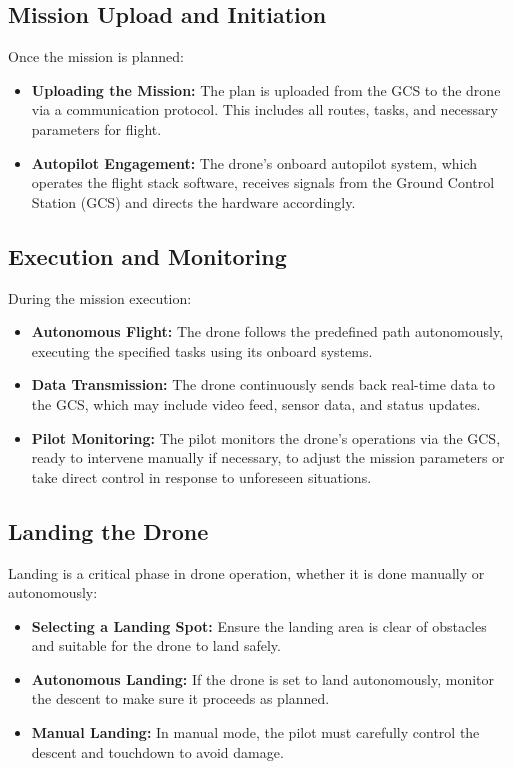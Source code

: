 \subsection{Mission Upload and Initiation}
Once the mission is planned:
\begin{itemize}
    \item \textbf{Uploading the Mission:} The plan is uploaded from the GCS to the drone via a communication protocol. This includes all routes, tasks, and necessary parameters for flight.
    \item \textbf{Autopilot Engagement:} The drone's onboard autopilot system, which operates the flight stack software, receives signals from the Ground Control Station (GCS) and directs the hardware accordingly.
\end{itemize}

\subsection{Execution and Monitoring}
During the mission execution:
\begin{itemize}
    \item \textbf{Autonomous Flight:} The drone follows the predefined path autonomously, executing the specified tasks using its onboard systems.
    \item \textbf{Data Transmission:} The drone continuously sends back real-time data to the GCS, which may include video feed, sensor data, and status updates.
    \item \textbf{Pilot Monitoring:} The pilot monitors the drone’s operations via the GCS, ready to intervene manually if necessary, to adjust the mission parameters or take direct control in response to unforeseen situations.
\end{itemize}

\subsection{Landing the Drone}
Landing is a critical phase in drone operation, whether it is done manually or autonomously:
\begin{itemize}
    \item \textbf{Selecting a Landing Spot:} Ensure the landing area is clear of obstacles and suitable for the drone to land safely.
    \item \textbf{Autonomous Landing:} If the drone is set to land autonomously, monitor the descent to make sure it proceeds as planned.
    \item \textbf{Manual Landing:} In manual mode, the pilot must carefully control the descent and touchdown to avoid damage.
\end{itemize}

